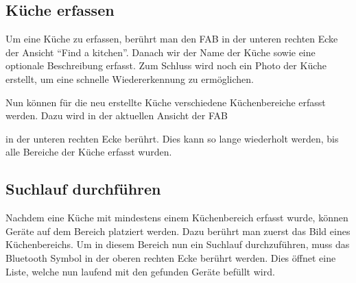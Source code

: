 \subsection{Küche erfassen}
Um eine Küche zu erfassen, berührt man den \acl{FAB} in der unteren rechten Ecke der Ansicht \enquote{Find a kitchen}. Danach wir der Name der Küche sowie eine optionale Beschreibung erfasst. Zum Schluss wird noch ein Photo der Küche erstellt, um eine schnelle Wiedererkennung zu ermöglichen.

Nun können für die neu erstellte Küche verschiedene Küchenbereiche erfasst werden. Dazu wird in der aktuellen Ansicht der \acl{FAB}

\WFclear
in der unteren rechten Ecke berührt. Dies kann so lange wiederholt werden, bis alle Bereiche der Küche erfasst wurden. 

\subsection{Suchlauf durchführen}

Nachdem eine Küche mit mindestens einem Küchenbereich erfasst wurde, können Geräte auf dem Bereich platziert werden. Dazu berührt man zuerst das Bild eines Küchenbereichs. Um in diesem Bereich nun ein Suchlauf durchzuführen, muss das Bluetooth Symbol in der oberen rechten Ecke berührt werden. Dies öffnet eine Liste, welche nun laufend mit den gefunden Geräte befüllt wird. 

